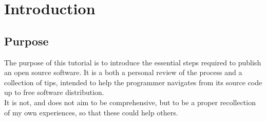 \documentclass{./these-seb}
\begin{document}

%
\newcommand{\ubuntu}{Ubuntu }
\renewcommand{\figurename}{Figure}
\renewcommand{\tablename}{Table}


\author{Sébastien {}\quad\href{mailo:sebastien.leroux@ipcms.unistra.fr}{sebastien.leroux@ipcms.unistra.fr}}

\beforepreface

\setcounter{page}{1}            %

{\small \tableofcontents}

\afterpreface

\vfill                          %
\pagebreak                      %

\chapter{Introduction}

\section{Purpose}

The purpose of this tutorial is to introduce the essential steps required to publish an open source software. 
It is a both a personal review of the process and a collection of tips, intended to help the programmer navigates from its source code up to free software distribution. \\
It is not, and does not aim to be comprehensive, but to be a proper recollection of my own experiences, so that these could help others. 
\end{document}
